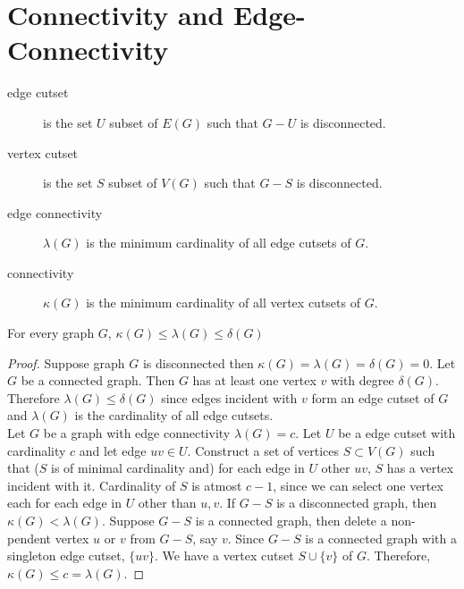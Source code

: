 
\setcounter{section}{4}

\section{Connectivity and Edge-Connectivity}

\begin{description}
	\item[edge cutset] is the set $U$ subset of $E(G)$ such that $G-U$ is disconnected.
	\item[vertex cutset] is the set $S$ subset of $V(G)$ such that $G-S$ is disconnected.
	\item[edge connectivity] $\lambda(G)$ is the minimum cardinality of all edge cutsets of $G$.
	\item[connectivity] $\kappa(G)$ is the minimum cardinality of all vertex cutsets of $G$.
\end{description}

\begin{theorem}
	For every graph $G$, $\kappa(G) \le \lambda(G) \le \delta(G)$
\end{theorem}
\begin{proof}
	Suppose graph $G$ is disconnected then $\kappa(G) = \lambda(G) = \delta(G) = 0$. Let $G$ be a connected graph. Then $G$ has at least one vertex $v$ with degree $\delta(G)$. Therefore $\lambda(G) \le \delta(G)$ since edges incident with $v$ form an edge cutset of $G$ and $\lambda(G)$ is the cardinality of all edge cutsets.\\

	Let $G$ be a graph with edge connectivity $\lambda(G) = c$. Let $U$ be a edge cutset with cardinality $c$ and let edge $uv \in U$. Construct a set of vertices $S \subset V(G)$ such that ($S$ is of minimal cardinality and) for each edge in $U$ other $uv$, $S$ has a vertex incident with it. Cardinality of $S$ is atmost $c-1$, since we can select one vertex each for each edge in $U$ other than $u, v$. If $G-S$ is a disconnected graph, then $\kappa(G) < \lambda(G)$. Suppose $G-S$ is a connected graph, then delete a non-pendent vertex $u$ or $v$ from $G-S$, say $v$. Since $G-S$ is a connected graph with a singleton edge cutset, $\{ uv \}$. We have a vertex cutset $S \cup \{ v\}$ of $G$. Therefore, $\kappa(G) \le c = \lambda(G)$.
\end{proof}


